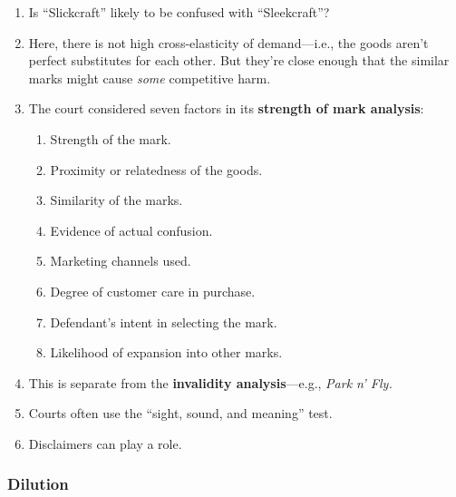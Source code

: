 \begin{enumerate}
    \item Is ``Slickcraft'' likely to be confused with ``Sleekcraft''?
    \item Here, there is not high cross-elasticity of demand---i.e., the goods 
    aren't perfect substitutes for each other. But they're close enough that 
    the similar marks might cause \emph{some} competitive harm.
    \item The court considered seven factors in its \textbf{strength of mark 
    analysis}:
    \begin{enumerate}
        \item Strength of the mark.
        \item Proximity or relatedness of the goods.
        \item Similarity of the marks.
        \item Evidence of actual confusion.
        \item Marketing channels used.
        \item Degree of customer care in purchase.
        \item Defendant's intent in selecting the mark.
        \item Likelihood of expansion into other marks.
    \end{enumerate}
    \item This is separate from the \textbf{invalidity analysis}---e.g., 
    \emph{Park n' Fly.}
    \item Courts often use the ``sight, sound, and meaning'' test.
    \item Disclaimers can play a role.
\end{enumerate}

\subsubsection{Dilution}

